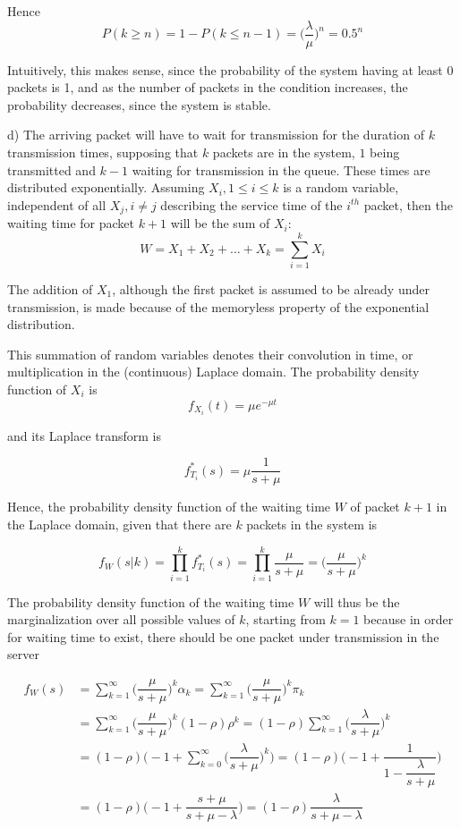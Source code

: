 Hence
$$P(k \geq n) = 1 - P(k \leq n-1) = \Big(\dfrac{\lambda}{\mu}\Big)^n = 0.5^n$$

Intuitively, this makes sense, since the probability of the system having at
least 0 packets is 1, and as the number of packets in the condition increases,
the probability decreases, since the system is stable.

d)
The arriving packet will have to wait for transmission for the duration of $k$
transmission times, supposing that $k$ packets are in the system, $1$ being
transmitted and $k-1$ waiting for transmission in the queue. These times are
distributed exponentially. Assuming $X_i, 1 \leq i \leq k$ is a random variable,
independent of all $X_j, i \neq j$ describing the service time of the $i^{th}$
packet, then the waiting time for packet $k+1$ will be the sum of $X_i$:
$$W = X_1 + X_2 + \dots + X_k = \sum_{i=1}^{k}X_i$$

The addition of $X_1$, although the first packet is assumed to be already
under transmission, is made because of the memoryless property of the exponential
distribution.

This summation of random variables denotes their convolution in time, or
multiplication in the (continuous) Laplace domain. The probability density
function of $X_i$ is
$$f_{X_i}(t) = \mu e^{-\mu t}$$

and its Laplace transform is

$$f^{*}_{T_i}(s) = \mu \dfrac{1}{s+\mu}$$

Hence, the probability density function of the waiting time $W$ of packet $k+1$ in
the Laplace domain, given that there are $k$ packets in the system is

$$f_W(s | k) = \prod_{i=1}^k f^{*}_{T_i}(s) = \prod_{i=1}^k \dfrac{\mu}{s+\mu} = \Big(\dfrac{\mu}{s+\mu}\Big)^k$$

The probability density function of the waiting time $W$ will thus be the
marginalization over all possible values of $k$, starting from $k=1$ because
in order for waiting time to exist, there should be one packet under
transmission in the server

\begin{align*}
  f_W(s) &= \sum_{k=1}^{\infty} \Big(\dfrac{\mu}{s+\mu}\Big)^k \alpha_k = \sum_{k=1}^{\infty} \Big(\dfrac{\mu}{s+\mu}\Big)^k \pi_k \\
         &= \sum_{k=1}^{\infty} \Big(\dfrac{\mu}{s+\mu}\Big)^k (1-\rho) \rho^k = (1-\rho) \sum_{k=1}^{\infty} \Big(\dfrac{\lambda}{s+\mu}\Big)^k \\
         &= (1-\rho) \Big(-1 + \sum_{k=0}^{\infty} \Big(\dfrac{\lambda}{s+\mu}\Big)^k\Big) = (1-\rho) \Big(-1 + \dfrac{1}{1-\dfrac{\lambda}{s+\mu}}\Big) \\
         &= (1-\rho)\Big(-1 + \dfrac{s+\mu}{s+\mu-\lambda}\Big) = (1-\rho) \dfrac{\lambda}{s+\mu-\lambda}
\end{align*}

